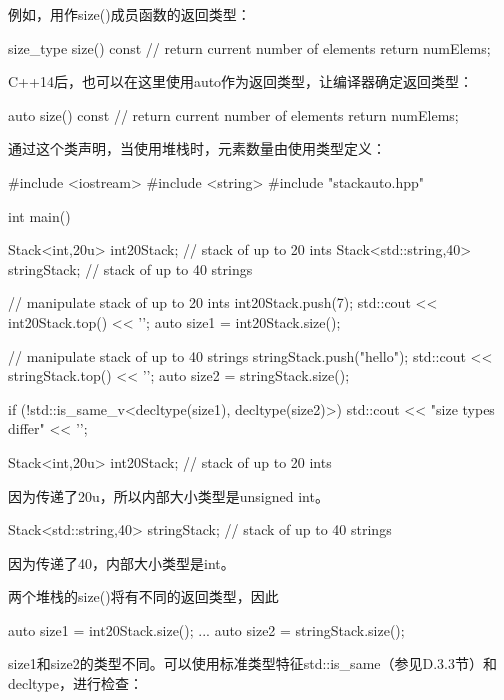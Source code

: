 例如，用作size()成员函数的返回类型：

\begin{cpp}
size_type size() const { // return current number of elements
	return numElems;
}
\end{cpp}

C++14后，也可以在这里使用auto作为返回类型，让编译器确定返回类型：

\begin{cpp}
auto size() const { // return current number of elements
	return numElems;
}
\end{cpp}

通过这个类声明，当使用堆栈时，元素数量由使用类型定义：

\begin{cpp}
#include <iostream>
#include <string>
#include "stackauto.hpp"

int main()
{
	Stack<int,20u> int20Stack; // stack of up to 20 ints
	Stack<std::string,40> stringStack; // stack of up to 40 strings
	
	// manipulate stack of up to 20 ints
	int20Stack.push(7);
	std::cout << int20Stack.top() << '\n';
	auto size1 = int20Stack.size();
	
	// manipulate stack of up to 40 strings
	stringStack.push("hello");
	std::cout << stringStack.top() << '\n';
	auto size2 = stringStack.size();
	
	if (!std::is_same_v<decltype(size1), decltype(size2)>) {
		std::cout << "size types differ" << '\n';
	}
}
\end{cpp}


\begin{cpp}
Stack<int,20u> int20Stack; // stack of up to 20 ints
\end{cpp}

因为传递了20u，所以内部大小类型是unsigned int。

\begin{cpp}
Stack<std::string,40> stringStack; // stack of up to 40 strings
\end{cpp}

因为传递了40，内部大小类型是int。

两个堆栈的size()将有不同的返回类型，因此

\begin{cpp}
auto size1 = int20Stack.size();
...
auto size2 = stringStack.size();
\end{cpp}

size1和size2的类型不同。可以使用标准类型特征std::is\_same（参见D.3.3节）和decltype，进行检查：

